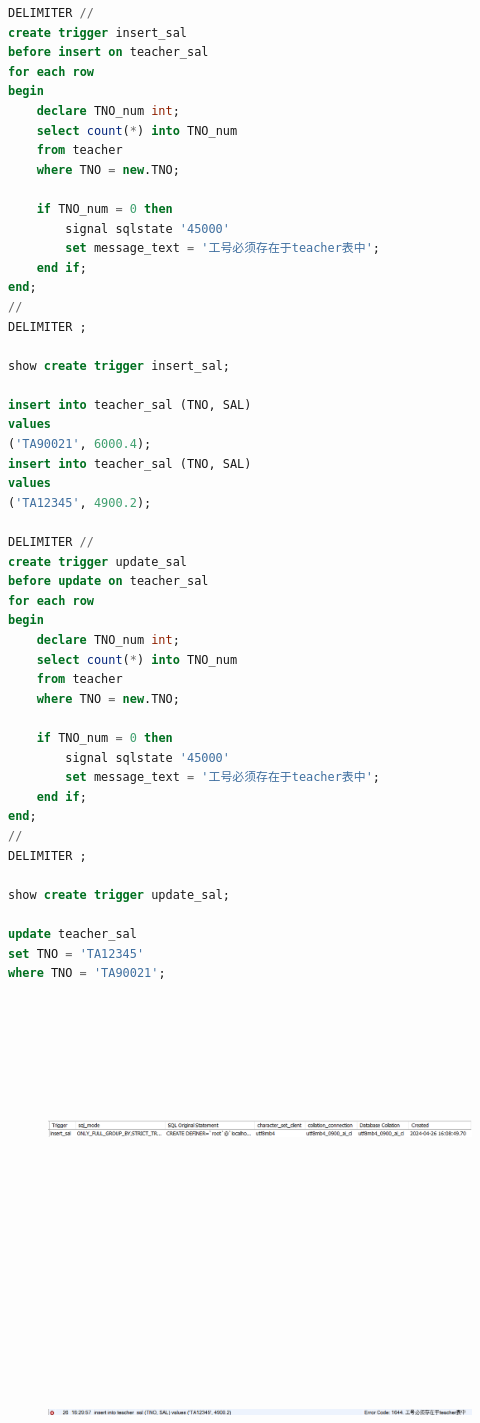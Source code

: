 \documentclass{ctexart}
\begin{document}
\begin{lstlisting}[language=sql]
DELIMITER //
create trigger insert_sal
before insert on teacher_sal
for each row
begin
	declare TNO_num int;
	select count(*) into TNO_num
    from teacher
    where TNO = new.TNO;
    
    if TNO_num = 0 then
		signal sqlstate '45000'
        set message_text = '工号必须存在于teacher表中';
	end if;
end;
//
DELIMITER ;

show create trigger insert_sal;

insert into teacher_sal (TNO, SAL)
values
('TA90021', 6000.4);
insert into teacher_sal (TNO, SAL)
values
('TA12345', 4900.2);

DELIMITER //
create trigger update_sal
before update on teacher_sal
for each row
begin
	declare TNO_num int;
	select count(*) into TNO_num
    from teacher
    where TNO = new.TNO;
    
    if TNO_num = 0 then
		signal sqlstate '45000'
        set message_text = '工号必须存在于teacher表中';
	end if;
end;
//
DELIMITER ;

show create trigger update_sal;

update teacher_sal 
set TNO = 'TA12345'
where TNO = 'TA90021';
\end{lstlisting}
\begin{figure}[H]
	\centering 
	\includegraphics[height=7cm,width=14cm]{51.png}
	\end{figure}
	\begin{figure}[H]
		\centering 
		\includegraphics[height=7cm,width=14cm]{52.png}
		\end{figure}
\end{document}
